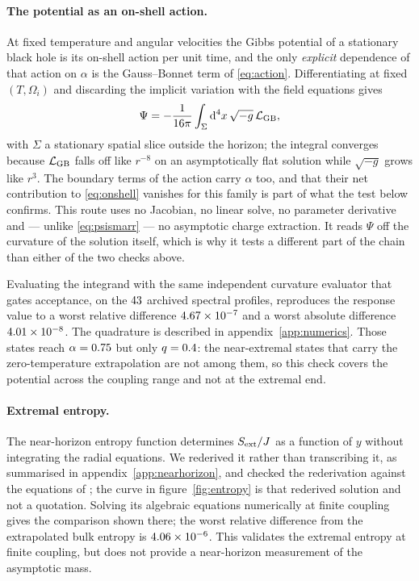 \documentclass[11pt,a4paper]{article}
\begin{document}
\paragraph{The potential as an on-shell action.}
At fixed temperature and angular velocities the Gibbs potential of a stationary
black hole is its on-shell action per unit time, and the only \emph{explicit}
dependence of that action on $\alpha$ is the Gauss--Bonnet term of
\eqref{eq:action}. Differentiating at fixed $(T,\Omega_i)$ and discarding the
implicit variation with the field equations gives
\begin{equation}
 \Psi=-\frac1{16\pi}\int_\Sigma\mathrm{d}^4x\,\sqrt{-g}\,\mathcal L_{\mathrm{GB}} ,
 \label{eq:onshell}
\end{equation}
with $\Sigma$ a stationary spatial slice outside the horizon; the integral
converges because $\mathcal L_{\mathrm{GB}}$ falls off like $r^{-8}$ on an
asymptotically flat solution while $\sqrt{-g}$ grows like $r^3$. The boundary
terms of the action carry $\alpha$ too, and that their net contribution to
\eqref{eq:onshell} vanishes for this family is part of what the test below
confirms. This route uses no Jacobian, no linear solve, no
parameter derivative and --- unlike \eqref{eq:psismarr} --- no asymptotic
charge extraction. It reads $\Psi$ off the curvature of the solution itself,
which is why it tests a different part of the chain than either of the two
checks above.

Evaluating the integrand with the same independent curvature evaluator that
gates acceptance, on the $43$ archived spectral profiles,
reproduces the response value to a worst relative difference $4.67\times 10^{-7}$
and a worst absolute difference $4.01\times 10^{-8}$. The quadrature is
described in appendix~\ref{app:numerics}. Those states reach
$\alpha=0.75$ but only $q=0.4$: the near-extremal
states that carry the zero-temperature extrapolation are not among them, so
this check covers the potential across the coupling range and not at the
extremal end.

\paragraph{Extremal entropy.}
The near-horizon entropy function determines $S_{\mathrm{ext}}/J$ as a function of $y$
without integrating the radial equations. We rederived it rather than
transcribing it, as summarised in appendix~\ref{app:nearhorizon}, and checked
the rederivation against the equations of \cite{Brihaye:2010wp};
the curve in figure~\ref{fig:entropy} is that rederived solution and not a
quotation. Solving its algebraic equations numerically at finite coupling gives
the comparison shown there; the worst relative difference
from the extrapolated bulk entropy is $4.06\times 10^{-6}$.
This validates the extremal entropy at finite coupling, but does not
provide a near-horizon measurement of the asymptotic mass.
\end{document}
